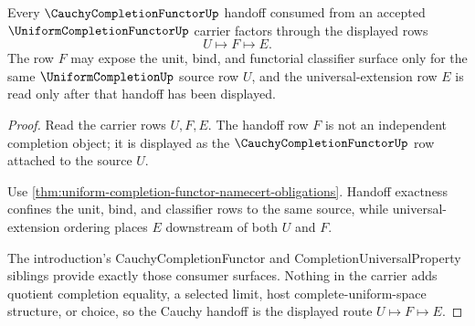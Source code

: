 \begin{theorem}
\label{thm:uniformcompletionfunctor-cauchy-handoff}
Every $\CauchyCompletionFunctorUp$ handoff consumed from an accepted $\UniformCompletionFunctorUp$ carrier factors through the displayed rows
$$
U \longmapsto F \longmapsto E .
$$
The row $F$ may expose the unit, bind, and functorial classifier surface only for the same $\UniformCompletionUp$ source row $U$, and the universal-extension row $E$ is read only after that handoff has been displayed.
\end{theorem}
\begin{proof}
Read the carrier rows $U,F,E$. The handoff row $F$ is not an independent completion object; it is displayed as the $\CauchyCompletionFunctorUp$ row attached to the source $U$.

Use \autoref{thm:uniform-completion-functor-namecert-obligations}. Handoff exactness confines the unit, bind, and classifier rows to the same source, while universal-extension ordering places $E$ downstream of both $U$ and $F$.

The introduction's CauchyCompletionFunctor and CompletionUniversalProperty siblings provide exactly those consumer surfaces. Nothing in the carrier adds quotient completion equality, a selected limit, host complete-uniform-space structure, or choice, so the Cauchy handoff is the displayed route $U \longmapsto F \longmapsto E$.
\end{proof}

